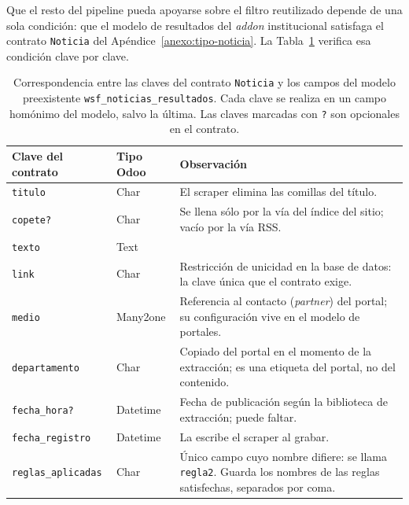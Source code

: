 \documentclass[12pt]{report}
\begin{document}
Que el resto del pipeline pueda apoyarse sobre el filtro reutilizado depende de una sola condición: que el modelo de resultados del \textit{addon} institucional satisfaga el contrato \texttt{Noticia} del Apéndice~\ref{anexo:tipo-noticia}. La Tabla~\ref{tab:impl-noticia-mapeo} verifica esa condición clave por clave.

\begin{table}[H]
  \centering
  \caption{Correspondencia entre las claves del contrato \texttt{Noticia} y los campos del modelo preexistente \texttt{wsf\_noticias\_resultados}. Cada clave se realiza en un campo homónimo del modelo, salvo la última. Las claves marcadas con \texttt{?} son opcionales en el contrato.}
  \label{tab:impl-noticia-mapeo}
  \footnotesize
  \setlength{\tabcolsep}{4pt}
  \begin{tabularx}{\textwidth}{@{}l l X@{}}
    \toprule
    \textbf{Clave del contrato} & \textbf{Tipo Odoo} & \textbf{Observación}                                                                                                         \\
    \midrule
    \texttt{titulo}             & Char               & El scraper elimina las comillas del título.                                                                                  \\
    \texttt{copete?}            & Char               & Se llena sólo por la vía del índice del sitio; vacío por la vía RSS.                                                         \\
    \texttt{texto}              & Text               &                                                                                                                              \\
    \texttt{link}               & Char               & Restricción de unicidad en la base de datos: la clave única que el contrato exige.                                           \\
    \texttt{medio}              & Many2one           & Referencia al contacto (\textit{partner}) del portal; su configuración vive en el modelo de portales.                        \\
    \texttt{departamento}       & Char               & Copiado del portal en el momento de la extracción; es una etiqueta del portal, no del contenido.                             \\
    \texttt{fecha\_hora?}       & Datetime           & Fecha de publicación según la biblioteca de extracción; puede faltar.                                                        \\
    \texttt{fecha\_registro}    & Datetime           & La escribe el scraper al grabar.                                                                                             \\
    \texttt{reglas\_aplicadas}  & Char               & Único campo cuyo nombre difiere: se llama \texttt{regla2}. Guarda los nombres de las reglas satisfechas, separados por coma. \\
    \bottomrule
  \end{tabularx}
\end{table}
\end{document}
